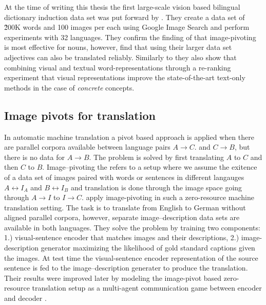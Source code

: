 At the time of writing this thesis
the first large-scale vision based bilingual dictionary induction data set
was put forward by \citep{hewitt2018learning}. They create a data set
of \~200K words and 100 images per each using Google Image Search and perform
experiments with 32 languages.
They confirm the finding of \cite{hartmann2017limitations} that image-pivoting
is most effective for nouns, however, find that using their larger data set
adjectives can also be translated reliably. Similarly to \cite{vulic2016multi}
they also show that combining
visual and textual word-representations through a re-ranking
experiment that visual representations improve the state-of-the-art
text-only methods in the case of \emph{concrete} concepts.

\subsection{Image pivots for translation}
\label{sec:imgpivot}

In automatic machine translation a pivot based approach is applied
when there are parallel corpora available between language pairs $A\rightarrow C$.
and $C \rightarrow B$, but there is no data for $A\rightarrow B$. The problem is
solved by first translating $A$ to $C$ and then $C$ to $B$. 
Image--pivoting the refers to a setup where we assume the exitence of a data set
of images paired with words or sentences in different langauges $A \leftrightarrow I_A$ and 
$B \leftrightarrow I_B$ and translation is done through the image space 
going  through $A \rightarrow I$ to $I \rightarrow C$. 
\cite{nakayama2017zero} apply image-pivoting in such a zero-resource machine
translation setting. The task is to translate from English to German without
aligned parallel corpora, however, separate image--description data sets are
available in both languages. They solve the problem by
training two components: 1.) visual-sentence encoder that matches images and their descriptions,
2.) image-description generator maximizing the likelihood of gold standard captions given the images.
At test time the visual-sentence encoder representation of the source sentence is fed to the
image--description generater to produce the translation.
Their results were improved later by modeling
the image-pivot based zero-resource translation setup as a
multi-agent communication game between encoder and decoder
\citep{chen2018zero,lee2017emergent}.






